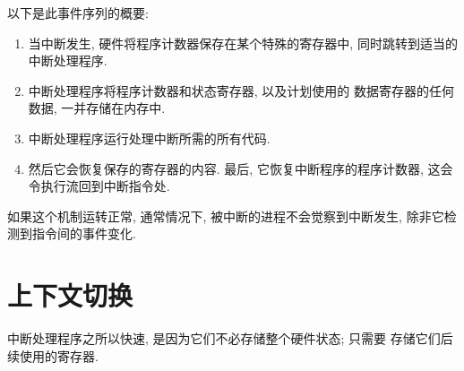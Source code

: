 \documentclass[12pt]{book}
\begin{document}
{%
以下是此事件序列的概要: 

\begin{enumerate}

\item 当中断发生, 硬件将程序计数器保存在某个特殊的寄存器中, 
同时跳转到适当的中断处理程序. 

\item 中断处理程序将程序计数器和状态寄存器, 以及计划使用的
数据寄存器的任何数据, 一并存储在内存中.

\item 中断处理程序运行处理中断所需的所有代码. 

\item 然后它会恢复保存的寄存器的内容. 最后, 它恢复中断程序的程序计数器, 
这会令执行流回到中断指令处. 

\end{enumerate}

如果这个机制运转正常, 通常情况下, 被中断的进程不会觉察到中断发生, 
除非它检测到指令间的事件变化.


\section{上下文切换}

中断处理程序之所以快速, 是因为它们不必存储整个硬件状态; 只需要
存储它们后续使用的寄存器.

}
\end{document}
